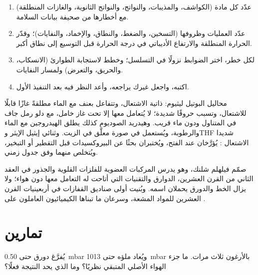 \begin{method}\label{met:b3:lab-techniques-3:risk-assessment}
\begin{enumerate}
  \item عدّد كل مادة (الكواشف، والمذيبات، والنواتج، والنواتج الثانوية، والغازات
        المنطلقة) مع أخطارها من صحيفة بيانات السلامة.
  \item عدّد العمليات وظروفها (التسخين، والضغط، والنطاق،
        والإخماد، والنفايات)؛ وقدّر الحرارة المنطلقة والارتفاع الأديباتي في درجة الحرارة
        قبل التوسيع إلى نطاق أكبر.
  \item لكل خطر، اختر الضوابط نزولًا في التسلسل؛ وخطط لاستجابة
        الطوارئ (الانسكاب، والحريق، والتعرض) ولمسار النفايات.
  \item اكتبه، واجعل غيرك يراجعه، وأعد النظر فيه بعد التنفيذ الأول.
\end{enumerate}
\end{method}

\begin{safety}{}
محاليل البوتيل ليثيوم: ذاتية الاشتعال، وتتفاعل بعنف مع الماء مطلقةً
غازًا قابلًا للاشتعال، وتسبب حروقًا شديدة؛ لا يُتعامل معها إلا تحت غاز خامل، مع دلو
رمل جاف في المتناول ودون ماء قريب. وهيدريد الصوديوم كذلك يطلق
الهيدروجين مع الماء والرطوبة، ويُستعمل في صورة معلَّق في الزيت. وثنائي إيثيل
الإيثر وTHF شديدا الاشتعال : يُؤرَّخان عند الفتح، ويُختبران بحثًا عن
البيروكسيدات قبل التقطير أو التبخير، ويُتخلص منهما وفق جدول زمني.
\end{safety}

\begin{history}
صمّم فيلهلم شلنك، وهو يدرس المركبات العضوية للفلزات القلوية والجذور في العقد الثاني من القرن العشرين،
الدوارق والتقنيات التي أتاحت له التعامل معها دون هواء؛ ولا يزال
الخط والدورق يحملان اسمه. وبُنيت أولى صناديق القفازات في
أربعينيات القرن العشرين للمواد المشعة، وسرعان ما تبناها الكيميائيون العاملون على
.
\end{history}

\section{تمارين}

\begin{exercise}[$\star$]\label{exo:b3:lab-techniques-3:1}
يُفرَّغ دورق حتى \qty{0.50}{mbar} ويُعاد ملؤه حتى \qty{1013}{mbar} بالأرغون ثلاث مرات. ما جزء
الهواء الأصلي المتبقي نظريًا؟ وما الذي يحد النتيجة فعلًا؟
\end{exercise}

